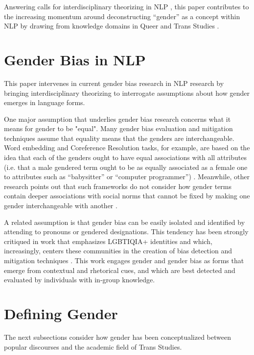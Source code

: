 \documentclass[anonymous,review]{acmart}
\begin{document}
Answering calls for interdisciplinary theorizing in NLP \citep{wang:2025,birhane:2022}, this paper contributes to the increasing momentum around deconstructing “gender” as a concept within NLP by drawing from knowledge domains in Queer and Trans Studies \citep{hafner:2025,calado:2025}.

\section{Gender Bias in NLP}
This paper intervenes in current gender bias research in NLP research by bringing interdisciplinary theorizing to interrogate assumptions about how gender emerges in language forms.

One major assumption that underlies gender bias research concerns what it means for gender to be "equal". Many gender bias evaluation and mitigation techniques assume that equality means that the genders are interchangeable. Word embedding and Coreference Resolution tasks, for example, are based on the idea that each of the genders ought to have equal associations with all attributes (i.e. that a male gendered term ought to be as equally associated as a female one to attributes such as “babysitter” or “computer programmer”) \citep{bolukbasi:2016,rudinger:2018,guo:2021}. Meanwhile, other research points out that such frameworks do not consider how gender terms contain deeper associations with social norms that cannot be fixed by making one gender interchangeable with another \citep{blodgett:2020,gonen:2019}. 

A related assumption is that gender bias can be easily isolated and identified by attending to pronouns or gendered designations. This tendency has been strongly critiqued in work that emphasizes LGBTIQIA+ identities and which, increasingly, centers these communities in the creation of bias detection and mitigation techniques \citep{felkner:2023,devinney:2020,lameiro:2025,ovalle:2023,hafner:2025,calado:2025}. This work engages gender and gender bias as forms that emerge from contextual and rhetorical cues, and which are best detected and evaluated by individuals with in-group knowledge.

\section{Defining Gender}

The next subsections consider how gender has been conceptualized between popular discourses and the academic field of Trans Studies.
\end{document}
